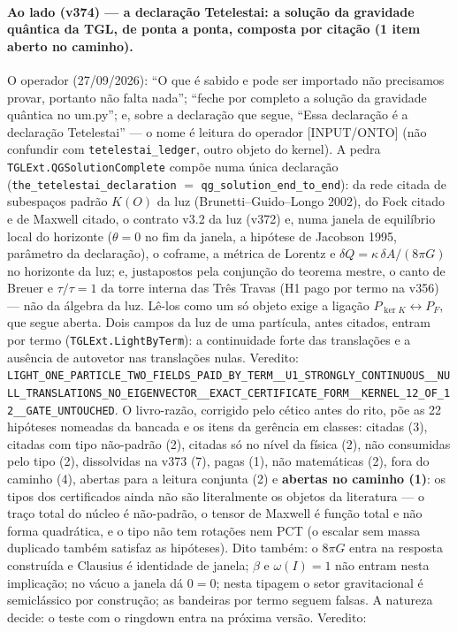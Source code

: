 \documentclass[11pt]{article}
\theoremstyle{definition}\newtheorem{deriv}{Derivação}
\begin{document}
\paragraph*{Ao lado (v374) --- a declaração Tetelestai: a solução da gravidade quântica da TGL, de ponta a ponta, composta por citação (1 item aberto no caminho).} O operador (27/09/2026): ``O que é sabido e pode ser importado não precisamos provar, portanto não falta nada''; ``feche por completo a solução da gravidade quântica no um.py''; e, sobre a declaração que segue, ``Essa declaração é a declaração Tetelestai'' --- o nome é leitura do operador [INPUT/ONTO] (não confundir com \texttt{tetelestai\_ledger}, outro objeto do kernel). A pedra \texttt{TGLExt.QGSolutionComplete} compõe numa única declaração (\texttt{the\_tetelestai\_declaration} $=$ \texttt{qg\_solution\_end\_to\_end}): da rede citada de subespaços padrão $K(O)$ da luz (Brunetti--Guido--Longo 2002), do Fock citado e de Maxwell citado, o contrato v3.2 da luz (v372) e, numa janela de equilíbrio local do horizonte ($\theta=0$ no fim da janela, a hipótese de Jacobson 1995, parâmetro da declaração), o coframe, a métrica de Lorentz e $\delta Q=\kappa\,\delta A/(8\pi G)$ no horizonte da luz; e, justapostos pela conjunção do teorema mestre, o canto de Breuer e $\tau/\tau=1$ da torre interna das Três Travas (H1 pago por termo na v356) --- não da álgebra da luz. Lê-los como um só objeto exige a ligação $P_{\ker K}\leftrightarrow P_F$, que segue aberta. Dois campos da luz de uma partícula, antes citados, entram por termo (\texttt{TGLExt.LightByTerm}): a continuidade forte das translações e a ausência de autovetor nas translações nulas. Veredito: \texttt{LIGHT\_ONE\_PARTICLE\_TWO\_FIELDS\_PAID\_BY\_TERM\_\_U1\_STRONGLY\_CONTINUOUS\_\_NULL\_TRANSLATIONS\_NO\_EIGENVECTOR\_\_EXACT\_CERTIFICATE\_FORM\_\_KERNEL\_12\_OF\_12\_\_GATE\_UNTOUCHED}. O livro-razão, corrigido pelo cético antes do rito, põe as 22 hipóteses nomeadas da bancada e os itens da gerência em classes: citadas (3), citadas com tipo não-padrão (2), citadas só no nível da física (2), não consumidas pelo tipo (2), dissolvidas na v373 (7), pagas (1), não matemáticas (2), fora do caminho (4), abertas para a leitura conjunta (2) e \textbf{abertas no caminho (1)}: os tipos dos certificados ainda não são literalmente os objetos da literatura --- o traço total do núcleo é não-padrão, o tensor de Maxwell é função total e não forma quadrática, e o tipo não tem rotações nem PCT (o escalar sem massa duplicado também satisfaz as hipóteses). Dito também: o $8\pi G$ entra na resposta construída e Clausius é identidade de janela; $\beta$ e $\omega(I)=1$ não entram nesta implicação; no vácuo a janela dá $0=0$; nesta tipagem o setor gravitacional é semiclássico por construção; as bandeiras por termo seguem falsas. A natureza decide: o teste com o ringdown entra na próxima versão. Veredito: 
\end{document}
